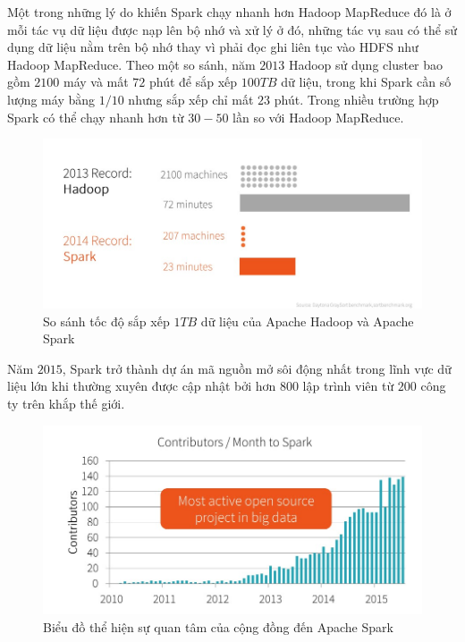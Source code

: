 Một trong những lý do khiến Spark chạy nhanh hơn Hadoop MapReduce đó là ở mỗi tác vụ dữ liệu được nạp lên bộ nhớ và xử lý ở đó, những tác vụ sau có thể sử dụng dữ liệu nằm trên bộ nhớ thay vì phải đọc ghi liên tục vào HDFS như Hadoop MapReduce. Theo một so sánh, năm $2013$ Hadoop sử dụng cluster bao gồm $2100$ máy và mất $72$ phút để sắp xếp $100 TB$ dữ liệu, trong khi Spark cần số lượng máy bằng $1/10$ nhưng sắp xếp chỉ mất $23$ phút. Trong nhiều trường hợp Spark có thể chạy nhanh hơn từ $30-50$ lần so với Hadoop MapReduce.

\begin{figure}[H]
	\centering
	\includegraphics[width=0.9\linewidth]{Chapter4/Chapter4Figs/stark5}
	\caption{So sánh tốc độ sắp xếp $1TB$ dữ liệu của Apache Hadoop và Apache Spark}
	\label{fig:stark5}
\end{figure}

Năm $2015$, Spark trở thành dự án mã nguồn mở sôi động nhất trong lĩnh vực dữ liệu lớn khi thường xuyên được cập nhật bởi hơn $800$ lập trình viên từ $200$ công ty trên khắp thế giới.
\begin{figure}[H]
	\centering
	\includegraphics[width=0.9\linewidth]{Chapter4/Chapter4Figs/stark8}
	\caption{Biểu đồ thể hiện sự quan tâm của cộng đồng đến Apache Spark}
	\label{fig:stark8}
\end{figure}


